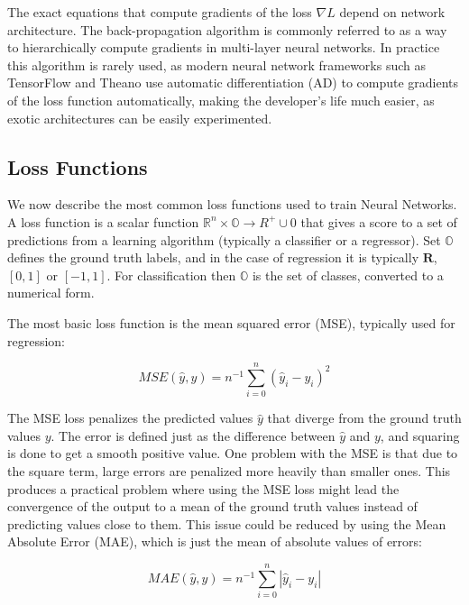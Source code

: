 The exact equations that compute gradients of the loss $\nabla L$ depend on network architecture. The back-propagation \cite[1em]{bishop2006pattern} algorithm is commonly referred to as a way to hierarchically compute gradients in multi-layer neural networks. In practice this algorithm is rarely used, as modern neural network frameworks such as TensorFlow and Theano use automatic differentiation \cite{baydin2017automatic} (AD) to compute gradients of the loss function automatically, making the developer's life much easier, as exotic architectures can be easily experimented.

\subsection{Loss Functions}

We now describe the most common loss functions used to train Neural Networks. A loss function is a scalar function $\mathbb{R}^n \times \mathbb{O} \rightarrow R^{+} \cup 0$ that gives a score to a set of predictions from a learning algorithm (typically a classifier or a regressor). Set $\mathbb{O}$ defines the ground truth labels, and in the case of regression it is typically $\mathbf{R}$, $[0, 1]$ or $[-1, 1]$. For classification then $\mathbb{O}$ is the set of classes, converted to a numerical form.

The most basic loss function is the mean squared error (MSE), typically used for regression:

\begin{equation}
	MSE(\hat{y}, y) = n^{-1} \sum_{i=0}^{n} (\hat{y}_i - y_i)^2
\end{equation}

The MSE loss penalizes the predicted values $\hat{y}$ that diverge from the ground truth values $y$. The error is defined just as the difference between $\hat{y}$ and $y$, and squaring is done to get a smooth positive value. One problem with the MSE is that due to the square term, large errors are penalized more heavily than smaller ones. This produces a practical problem where using the MSE loss might lead the convergence of the output to a mean of the ground truth values instead of predicting values close to them.
This issue could be reduced by using the Mean Absolute Error (MAE), which is just the mean of absolute values of errors:

\begin{equation}
    MAE(\hat{y}, y) = n^{-1} \sum_{i=0}^{n} |\hat{y}_i - y_i|
\end{equation}

